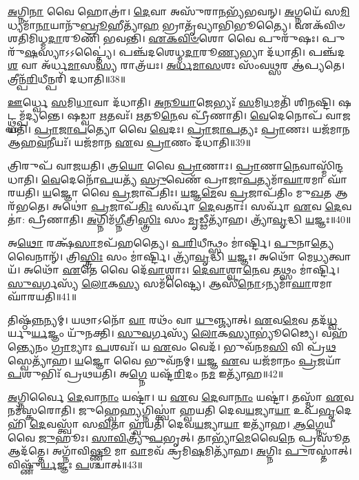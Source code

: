 \-\ul{𑌅}\-𑌗𑍍𑌨𑌿\-\ul{𑌨𑌾} 𑌵𑍈 𑌹𑍋𑌤𑍍𑌰𑌾॑।
\-\ul{𑌦𑍇}\-𑌵𑌾 𑌅𑌸𑍁᳴𑌰𑌾\-\ul{𑌨}\-𑌭𑍍𑌯᳴𑌭𑌵𑌨𑍍।
\-\ul{𑌅}\-𑌗𑍍𑌨𑌯𑍇᳴ 𑌸\-\ul{𑌮𑌿}\-𑌧𑍍𑌯𑌮𑌾᳴\-\ul{𑌨𑌾}\-𑌯𑌾𑌨𑍁᳴\-\ul{𑌬𑍍𑌰𑍂}\-𑌹𑍀𑌤𑍍𑌯𑌾᳴\-\ul{𑌹} 𑌭𑍍𑌰𑌾𑌤𑍃᳴𑌵𑍍𑌯𑌾𑌭𑌿𑌭𑍂𑌤𑍍𑌯𑍈।
𑌏𑌕᳴𑌵𑌿𑍞𑌶𑌤𑌿\-𑌮𑌿𑌧𑍍𑌮\-\ul{𑌦𑌾}\-𑌰𑍂𑌣𑌿᳴ 𑌭𑌵𑌨𑍍𑌤𑌿।
\-\ul{𑌏}\-\-\ul{𑌕}\-\-\ul{𑌵𑌿}\-\-\ul{𑍞}\-𑌶𑍋 𑌵𑍈 𑌪𑍁𑌰𑍁᳴𑌷𑌃।
𑌪𑍁𑌰𑍁᳴\-\ul{𑌷}\-𑌸𑍍𑌯𑌾𑌽𑌽𑌪𑍍𑌤𑍍𑌯𑍈॑।
𑌪𑌞𑍍𑌚᳴𑌦𑌶𑍇𑌧𑍍𑌮\-\-\ul{𑌦𑌾}\-𑌰𑍂\-\ul{𑌣𑍍𑌯}\-𑌭𑍍𑌯𑌾 𑌦᳴𑌧𑌾𑌤𑌿।
𑌪𑌞𑍍𑌚᳴𑌦\-\ul{𑌶} 𑌵𑌾 𑌅᳴𑌰𑍍𑌧\-\ul{𑌮𑌾}\-𑌸\-\ul{𑌸𑍍𑌯} 𑌰𑌾𑌤𑍍𑌰᳴𑌯𑌃।
\-\ul{𑌅}\-\-\ul{𑌰𑍍𑌧}\-\-\ul{𑌮𑌾}\-\-\ul{𑌸}\-𑌶𑌃 𑌸𑌂᳴𑌵\-\ul{𑌥𑍍𑌸}\-𑌰 𑌆॑𑌪𑍍𑌯𑌤𑍇।
𑌤𑍍𑌰𑍀𑌨𑍍𑌪᳴\-\ul{𑌰𑌿}\-𑌧𑍀𑌨𑍍𑌪𑌰𑌿᳴ 𑌦𑌧𑌾𑌤𑌿॥38॥

\-\ul{𑌊}\-𑌰𑍍𑌧𑍍𑌵𑍇 \ul{𑌸}\-𑌮𑌿\-\ul{𑌧𑌾}\-𑌵𑌾 𑌦᳴𑌧𑌾𑌤𑌿।
\-\ul{𑌅}\-\-\ul{𑌨𑍂}\-\-\ul{𑌯𑌾}\-𑌜𑍇𑌭𑍍𑌯𑌃᳴ \ul{𑌸}\-𑌮𑌿\-\ul{𑌧}\-𑌮𑌤𑌿᳴ 𑌶𑌿𑌨𑌷𑍍𑌟𑌿।
𑌷𑌟𑍍𑌥𑍍𑌸𑌮𑍍𑌪᳴𑌦𑍍𑌯𑌨𑍍𑌤𑍇।
𑌷𑌡𑍍𑌵𑌾 \ul{𑌋}\-𑌤𑌵𑌃᳴।
\-\ul{𑌋}\-𑌤𑍂\-\ul{𑌨𑍇}\-𑌵 𑌪𑍍𑌰𑍀᳴𑌣𑌾𑌤𑌿।
\-\ul{𑌵𑍇}\-𑌦𑍇𑌨𑍋𑌪᳴ 𑌵𑌾𑌜𑌯𑌤𑌿।
\-\ul{𑌪𑍍𑌰𑌾}\-\-\ul{𑌜𑌾}\-\-\ul{𑌪}\-𑌤𑍍𑌯𑍋 𑌵𑍈 \ul{𑌵𑍇}\-𑌦𑌃।
\-\ul{𑌪𑍍𑌰𑌾}\-\-\ul{𑌜𑌾}\-\-\ul{𑌪}\-𑌤𑍍𑌯𑌃 \ul{𑌪𑍍𑌰𑌾}\-𑌣𑌃।
𑌯𑌜᳴𑌮𑌾𑌨 𑌆𑌹\-\ul{𑌵}\-𑌨𑍀𑌯𑌃᳴।
𑌯𑌜᳴𑌮𑌾𑌨 \ul{𑌏}\-𑌵 \ul{𑌪𑍍𑌰𑌾}\-𑌣𑌂 𑌦᳴𑌧𑌾𑌤𑌿॥39॥

𑌤𑍍𑌰𑌿𑌰𑍁𑌪᳴ 𑌵𑌾𑌜𑌯𑌤𑌿।
𑌤𑍍𑌰\-\ul{𑌯𑍋} 𑌵𑍈 \ul{𑌪𑍍𑌰𑌾}\-𑌣𑌾𑌃।
\-\ul{𑌪𑍍𑌰𑌾}\-𑌣𑌾\-\ul{𑌨𑍇}\-𑌵𑌾𑌸𑍍𑌮𑌿᳴𑌨𑍍𑌦𑌧𑌾𑌤𑌿।
\-\ul{𑌵𑍇}\-𑌦𑍇𑌨𑍋᳴\-\ul{𑌪}\-𑌯𑌤𑍍𑌯᳴ \ul{𑌸𑍍𑌰𑍁}\-𑌵𑍇𑌣᳴ 𑌪𑍍𑌰𑌾𑌜𑌾\-\ul{𑌪}\-𑌤𑍍𑌯𑌮𑌾᳴\-\ul{𑌘𑌾}\-𑌰𑌮𑌾 𑌘𑌾᳴𑌰𑌯𑌤𑌿।
\-\ul{𑌯}\-𑌜𑍍𑌞𑍋 𑌵𑍈 \ul{𑌪𑍍𑌰}\-𑌜𑌾\-𑌪᳴𑌤𑌿𑌃।
\-\ul{𑌯}\-𑌜𑍍𑌞\-\ul{𑌮𑍇}\-𑌵 \ul{𑌪𑍍𑌰}\-𑌜𑌾𑌪᳴𑌤𑌿𑌂 𑌮𑍁\-\ul{𑌖}\-𑌤 𑌆𑌰᳴𑌭𑌤𑍇।
𑌅𑌥𑍋॑ \ul{𑌪𑍍𑌰}\-𑌜𑌾\-𑌪᳴\-\ul{𑌤𑌿𑌃} 𑌸𑌰𑍍𑌵𑌾᳴ \ul{𑌦𑍇}\-𑌵𑌤𑌾𑌃॑।
𑌸𑌰𑍍𑌵𑌾᳴ \ul{𑌏}\-𑌵 \ul{𑌦𑍇}\-𑌵𑌤𑌾॑: 𑌪𑍍𑌰𑍀𑌣𑌾𑌤𑌿।
\-\ul{𑌅}\-𑌗𑍍𑌨𑌿𑌮᳴\-\ul{𑌗𑍍𑌨𑍀}\-𑌤𑍍𑌰𑌿\-\ul{𑌸𑍍𑌤𑍍𑌰𑌿𑌃} 𑌸𑌂 \ul{𑌮𑍃}\-𑌡𑍍𑌢𑍀𑌤𑍍𑌯𑌾᳴𑌹।
𑌤𑍍𑌰𑍍𑌯𑌾᳴\-\ul{𑌵𑍃}\-𑌦𑍍𑌧𑌿 \ul{𑌯}\-𑌜𑍍𑌞𑌃॥40॥

𑌅\-\ul{𑌥𑍋} 𑌰𑌕𑍍𑌷᳴\-\ul{𑌸𑌾}\-𑌮𑌪᳴𑌹𑌤𑍍𑌯𑍈।
\-\ul{𑌪}\-\-\ul{𑌰𑌿}\-𑌧𑍀𑌨𑍍𑌥𑍍𑌸𑌂 𑌮𑌾॑𑌰𑍍𑌷𑍍𑌟𑌿।
\-\ul{𑌪𑍁}\-𑌨𑌾\-\ul{𑌤𑍍𑌯𑍇}\-𑌵𑍈𑌨𑌾𑌨𑍍᳴।
𑌤𑍍𑌰𑌿\-\ul{𑌸𑍍𑌤𑍍𑌰𑌿𑌃} 𑌸𑌂 𑌮𑌾॑𑌰𑍍𑌷𑍍𑌟𑌿।
𑌤𑍍𑌰𑍍𑌯𑌾᳴\-\ul{𑌵𑍃}\-𑌦𑍍𑌧𑌿 \ul{𑌯}\-𑌜𑍍𑌞𑌃।
𑌅𑌥𑍋᳴ 𑌮𑍇\-\ul{𑌧𑍍𑌯}\-𑌤𑍍𑌵𑌾𑌯᳴।
𑌅𑌥𑍋᳴ \ul{𑌏}\-𑌤𑍇 𑌵𑍈 𑌦𑍇᳴\-\ul{𑌵𑌾}\-𑌶𑍍𑌵𑌾𑌃।
\-\ul{𑌦𑍇}\-\-\ul{𑌵𑌾}\-𑌶𑍍𑌵𑌾\-\ul{𑌨𑍇}\-𑌵 𑌤𑌥𑍍𑌸𑌂 𑌮𑌾॑𑌰𑍍𑌷𑍍𑌟𑌿।
\-\ul{𑌸𑍁}\-\-\ul{𑌵}\-𑌰𑍍𑌗𑌸𑍍𑌯᳴ \ul{𑌲𑍋}\-𑌕\-\ul{𑌸𑍍𑌯} 𑌸𑌮᳴𑌷𑍍𑌟𑍍𑌯𑍈।
𑌆𑌸𑍀᳴\-\ul{𑌨𑍋}\-\-𑌽𑌨𑍍𑌯𑌮𑌾᳴\-\ul{𑌘𑌾}\-𑌰𑌮𑌾 𑌘𑌾᳴𑌰𑌯𑌤𑌿॥41॥

𑌤𑌿𑌷𑍍𑌠᳴\-\ul{𑌨𑍍𑌨}\-𑌨𑍍𑌯𑌮𑍍।
𑌯𑌥𑌾𑌽𑌨𑍋᳴ \ul{𑌵𑌾} 𑌰𑌥𑌂᳴ 𑌵𑌾 \ul{𑌯𑍁}\-𑌞𑍍𑌜𑍍𑌯𑌾𑌤𑍍।
\-\ul{𑌏}\-𑌵\-\ul{𑌮𑍇}\-𑌵 𑌤𑌦᳴\-\ul{𑌧𑍍𑌵}\-𑌰𑍍𑌯𑍁\-\ul{𑌰𑍍𑌯}\-𑌜𑍍𑌞𑌂 𑌯𑍁᳴𑌨𑌕𑍍𑌤𑌿।
\-\ul{𑌸𑍁}\-\-\ul{𑌵}\-𑌰𑍍𑌗𑌸𑍍𑌯᳴ \ul{𑌲𑍋}\-𑌕\-\ul{𑌸𑍍𑌯𑌾}\-𑌭𑍍𑌯𑍂॑𑌢𑍍𑌯𑍈।
𑌵𑌹᳴𑌨𑍍𑌤𑍍𑌯𑍇𑌨𑌂 \ul{𑌗𑍍𑌰𑌾}\-𑌮𑍍𑌯𑌾𑌃 \ul{𑌪}\-𑌶𑌵𑌃᳴।
𑌯 \ul{𑌏}\-𑌵𑌂 𑌵𑍇𑌦᳴।
𑌭𑍁𑌵᳴𑌨𑌮\-\ul{𑌸𑌿} 𑌵𑌿 𑌪𑍍𑌰᳴\-\ul{𑌥}\-𑌸𑍍𑌵𑍇𑌤𑍍𑌯𑌾᳴𑌹।
\-\ul{𑌯}\-𑌜𑍍𑌞𑍋 𑌵𑍈 𑌭𑍁𑌵᳴𑌨𑌮𑍍।
\-\ul{𑌯}\-𑌜𑍍𑌞 \ul{𑌏}\-𑌵 𑌯𑌜᳴𑌮𑌾𑌨𑌂 \ul{𑌪𑍍𑌰}\-𑌜𑌯𑌾᳴ \ul{𑌪}\-𑌶𑍁𑌭𑌿𑌃᳴ 𑌪𑍍𑌰𑌥𑌯𑌤𑌿।
𑌅\-\ul{𑌗𑍍𑌨𑍇} 𑌯𑌷𑍍𑌟᳴\-\ul{𑌰𑌿}\-𑌦𑌂 𑌨\-\ul{𑌮} 𑌇𑌤𑍍𑌯𑌾᳴𑌹॥42॥

\-\ul{𑌅}\-𑌗𑍍𑌨𑌿𑌰𑍍𑌵𑍈 \ul{𑌦𑍇}\-𑌵𑌾\-\ul{𑌨𑌾𑌂} 𑌯𑌷𑍍𑌟𑌾॑।
𑌯 \ul{𑌏}\-𑌵 \ul{𑌦𑍇}\-𑌵𑌾\-\ul{𑌨𑌾𑌂} 𑌯𑌷𑍍𑌟𑌾॑।
𑌤𑌸𑍍𑌮𑌾᳴ \ul{𑌏}\-𑌵 𑌨𑌮᳴𑌸𑍍𑌕𑌰𑍋𑌤𑌿।
𑌜𑍁𑌹𑍍𑌵𑍇\-\ul{𑌹𑍍𑌯}\-𑌗𑍍𑌨𑌿𑌸𑍍𑌤𑍍𑌵𑌾॑ 𑌹𑍍𑌵𑌯𑌤𑌿 𑌦𑍇𑌵\-\ul{𑌯}\-𑌜𑍍𑌯𑌾\-\ul{𑌯𑌾} 𑌉𑌪᳴\-\ul{𑌭𑍃}\-𑌦𑍇𑌹𑌿᳴ \ul{𑌦𑍇}\-𑌵𑌸𑍍𑌤𑍍𑌵𑌾᳴ 𑌸\-\ul{𑌵𑌿}\-𑌤𑌾 𑌹𑍍𑌵᳴𑌯𑌤𑌿 𑌦𑍇𑌵\-\ul{𑌯}\-𑌜𑍍𑌯𑌾\-\ul{𑌯𑌾} 𑌇𑌤𑍍𑌯𑌾᳴𑌹।
\-\ul{𑌆}\-\-\ul{𑌗𑍍𑌨𑍇}\-𑌯𑍀 𑌵𑍈 \ul{𑌜𑍁}\-𑌹𑍂𑌃।
\-\ul{𑌸𑌾}\-\-\ul{𑌵𑌿}\-𑌤𑍍𑌰𑍍𑌯𑍁᳴\-\ul{𑌪}\-𑌭𑍃𑌤𑍍।
𑌤𑌾𑌭𑍍𑌯𑌾᳴\-\ul{𑌮𑍇}\-𑌵𑍈\-\ul{𑌨𑍇} 𑌪𑍍𑌰𑌸𑍂᳴\-\ul{𑌤} 𑌆𑌦᳴𑌤𑍍𑌤𑍇।
𑌅𑌗𑍍𑌨𑌾᳴𑌵𑌿\-\ul{𑌷𑍍𑌣𑍂} 𑌮𑌾 \ul{𑌵𑌾}\-𑌮𑌵᳴ 𑌕𑍍𑌰𑌮𑌿\-\ul{𑌷}\-𑌮𑌿𑌤𑍍𑌯𑌾᳴𑌹।
\-\ul{𑌅}\-𑌗𑍍𑌨𑌿𑌃 \ul{𑌪𑍁}\-𑌰𑌸𑍍𑌤𑌾॑𑌤𑍍।
𑌵𑌿𑌷𑍍𑌣𑍁᳴\-\ul{𑌰𑍍𑌯}\-𑌜𑍍𑌞𑌃 \ul{𑌪}\-𑌶𑍍𑌚𑌾𑌤𑍍॥43॥

